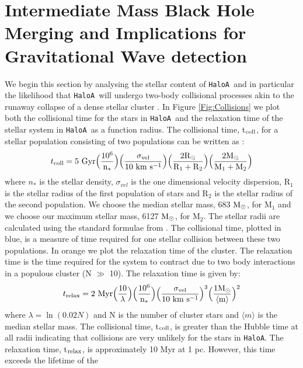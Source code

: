 \documentclass[graphics, twocolumn, usenatbib]{mn2e}
\newcommand{\msolarc} {$\rm{M_{\odot}}$}
\newcommand{\ha} {\texttt{HaloA~}}
\newcommand{\hac} {\texttt{HaloA}}
\begin{document}
\section{Intermediate Mass Black Hole Merging and Implications for Gravitational Wave detection} \label{Sec:GW}
We begin this section by analysing the stellar content of \ha and in particular the likelihood
that \ha will undergo two-body collisional processes akin to the runaway collapse of a dense stellar
cluster \citep{PortegiesZwart_2004, Gurkan_2004, Freitag_2006, Regan_2009b, Katz_2015}. In Figure
\ref{Fig:Collisions} we plot both the collisional time for the stars in \ha and the relaxation
time of the stellar system in \ha as a
function radius. The collisional time, t$_{\rm{coll}}$, for a stellar population consisting of two
populations can be written as \citep{Freitag_2008}:
\begin{equation}
  t_{\rm{coll}} = 5 \ \rm{Gyr} \Big( {10^6 \over n_*} \Big ) \Big( {\sigma_{vel} \over 10 \ \rm{km \ s^{-1}}} \Big ) \Big ({2 R_{\odot} \over R_1 + R_2} \Big) \Big ({2 M_{\odot} \over M_1 + M_2} \Big)
\end{equation}
where $n_*$ is the stellar density, $\sigma_{vel}$ is the one dimensional velocity dispersion,
R$_1$ is the stellar radius of the first population of stars and R$_2$ is the stellar radius of the
second population. We choose the median stellar mass, 683 \msolarc, for M$_1$ and we choose our
maximum stellar mass, 6127 \msolarc, for M$_2$. The stellar radii are calculated using the standard
formulae from \cite{Stahler_1986}. The collisional time, plotted in blue, is a measure of time
required for one
stellar collision between these two populations. In orange we plot the relaxation time of the cluster.
The relaxation time is the time required for the system to contract due to two body interactions in a
populous cluster (N $\gg$ 10). The relaxation time is given by:
\begin{equation}
  t_{\rm{relax}} = 2 \ \rm{Myr} \Big ( {10 \over \lambda} \Big )  \Big( {10^6 \over n_*} \Big ) \Big( {\sigma_{vel} \over 10 \ \rm{km \ s^{-1}}} \Big )^3 \Big ( {1  M_{\odot} \over \langle m \rangle } \Big )^2
\end{equation}
where $\lambda = \ln (0.02 N)$ and  N is the number of cluster stars and $\langle m \rangle$
is the median stellar mass. The collisional time, t$_{\rm{coll}}$, is greater than the Hubble time
at all radii indicating that collisions are very unlikely for the stars in \hac. The relaxation time,
t$_{\rm{relax}}$, is approximately 10 Myr at 1 pc. However, this time exceeds the lifetime of the
\end{document}
